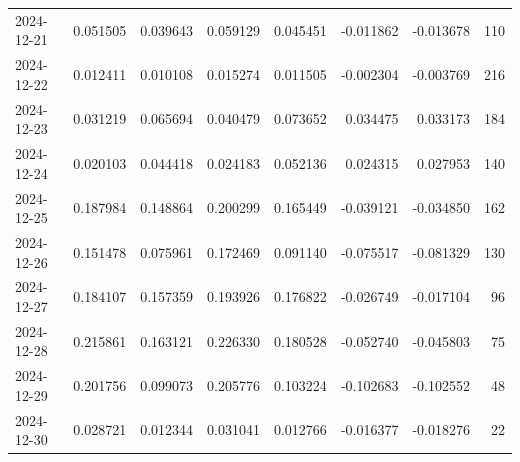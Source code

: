 \begin{tabular}{lrrrrrrr}
2024-12-21 & 0.051505 & 0.039643 & 0.059129 & 0.045451 & -0.011862 & -0.013678 & 110 \\
2024-12-22 & 0.012411 & 0.010108 & 0.015274 & 0.011505 & -0.002304 & -0.003769 & 216 \\
2024-12-23 & 0.031219 & 0.065694 & 0.040479 & 0.073652 & 0.034475 & 0.033173 & 184 \\
2024-12-24 & 0.020103 & 0.044418 & 0.024183 & 0.052136 & 0.024315 & 0.027953 & 140 \\
2024-12-25 & 0.187984 & 0.148864 & 0.200299 & 0.165449 & -0.039121 & -0.034850 & 162 \\
2024-12-26 & 0.151478 & 0.075961 & 0.172469 & 0.091140 & -0.075517 & -0.081329 & 130 \\
2024-12-27 & 0.184107 & 0.157359 & 0.193926 & 0.176822 & -0.026749 & -0.017104 & 96 \\
2024-12-28 & 0.215861 & 0.163121 & 0.226330 & 0.180528 & -0.052740 & -0.045803 & 75 \\
2024-12-29 & 0.201756 & 0.099073 & 0.205776 & 0.103224 & -0.102683 & -0.102552 & 48 \\
2024-12-30 & 0.028721 & 0.012344 & 0.031041 & 0.012766 & -0.016377 & -0.018276 & 22 \\
\bottomrule
\end{tabular}
